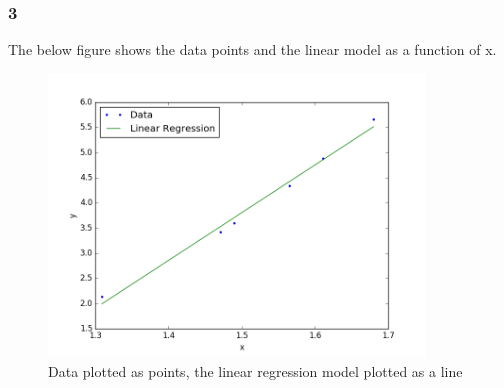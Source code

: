 \documentclass{article}
\begin{document}
\subsubsection{3}
The below figure shows the data points and the linear model as a function of x.
\begin{figure}[H]
  \centering
  \includegraphics[width=10cm]{ass5.png}
  \caption{Data plotted as points, the linear regression model plotted as a line}
  \label{fig:fig2}
\end{figure}
\end{document}
